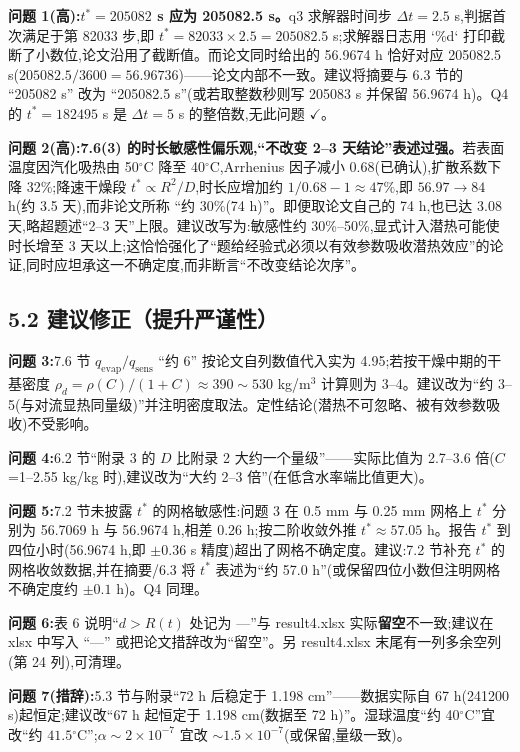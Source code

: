 \documentclass[12pt,a4paper]{ctexart}
\newcommand{\ok}{$\checkmark$}
\newcommand{\dg}{\ensuremath{^\circ}}
\begin{document}
\textbf{问题 1(高):$t^*=205082$ s 应为 205082.5 s。}q3 求解器时间步 $\Delta t=2.5$ s,判据首次满足于第 82033 步,即 $t^*=82033\times2.5=205082.5$ s;求解器日志用 `\%d` 打印截断了小数位,论文沿用了截断值。而论文同时给出的 56.9674 h 恰好对应 205082.5 s($205082.5/3600=56.96736$)——论文内部不一致。建议将摘要与 6.3 节的 ``205082 s'' 改为 ``205082.5 s''(或若取整数秒则写 205083 s 并保留 56.9674 h)。Q4 的 $t^*=182495$ s 是 $\Delta t=5$ s 的整倍数,无此问题 \ok。

\textbf{问题 2(高):7.6(3) 的时长敏感性偏乐观,``不改变 2--3 天结论''表述过强。}若表面温度因汽化吸热由 50\dg C 降至 40\dg C,Arrhenius 因子减小 0.68(已确认),扩散系数下降 32\%;降速干燥段 $t^*\propto R^2/D$,时长应增加约 $1/0.68-1\approx47\%$,即 $56.97\to84$ h(约 3.5 天),而非论文所称 ``约 30\%(74 h)''。即便取论文自己的 74 h,也已达 3.08 天,略超题述``2--3 天''上限。建议改写为:敏感性约 30\%--50\%,显式计入潜热可能使时长增至 3 天以上;这恰恰强化了``题给经验式必须以有效参数吸收潜热效应''的论证,同时应坦承这一不确定度,而非断言``不改变结论次序''。

\subsection{5.2 建议修正（提升严谨性）}

\textbf{问题 3:}7.6 节 $q_{\mathrm{evap}}/q_{\mathrm{sens}}$ ``约 6'' 按论文自列数值代入实为 4.95;若按干燥中期的干基密度 $\rho_d=\rho(C)/(1+C)\approx390\sim530$ kg/m$^3$ 计算则为 3--4。建议改为``约 3--5(与对流显热同量级)''并注明密度取法。定性结论(潜热不可忽略、被有效参数吸收)不受影响。

\textbf{问题 4:}6.2 节``附录 3 的 $D$ 比附录 2 大约一个量级''——实际比值为 2.7--3.6 倍($C$=1--2.55 kg/kg 时),建议改为``大约 2--3 倍''(在低含水率端比值更大)。

\textbf{问题 5:}7.2 节未披露 $t^*$ 的网格敏感性:问题 3 在 0.5 mm 与 0.25 mm 网格上 $t^*$ 分别为 56.7069 h 与 56.9674 h,相差 0.26 h;按二阶收敛外推 $t^*\approx57.05$ h。报告 $t^*$ 到四位小时(56.9674 h,即 $\pm0.36$ s 精度)超出了网格不确定度。建议:7.2 节补充 $t^*$ 的网格收敛数据,并在摘要/6.3 将 $t^*$ 表述为``约 57.0 h''(或保留四位小数但注明网格不确定度约 $\pm0.1$ h)。Q4 同理。

\textbf{问题 6:}表 6 说明``$d>R(t)$ 处记为 ---''与 result4.xlsx 实际\textbf{留空}不一致;建议在 xlsx 中写入 ``---'' 或把论文措辞改为``留空''。另 result4.xlsx 末尾有一列多余空列(第 24 列),可清理。

\textbf{问题 7(措辞):}5.3 节与附录``72 h 后稳定于 1.198 cm''——数据实际自 67 h(241200 s)起恒定;建议改``67 h 起恒定于 1.198 cm(数据至 72 h)''。湿球温度``约 40\dg C''宜改``约 $41.5\dg$C'';$\alpha\sim2\times10^{-7}$ 宜改 $\sim1.5\times10^{-7}$(或保留,量级一致)。
\end{document}
